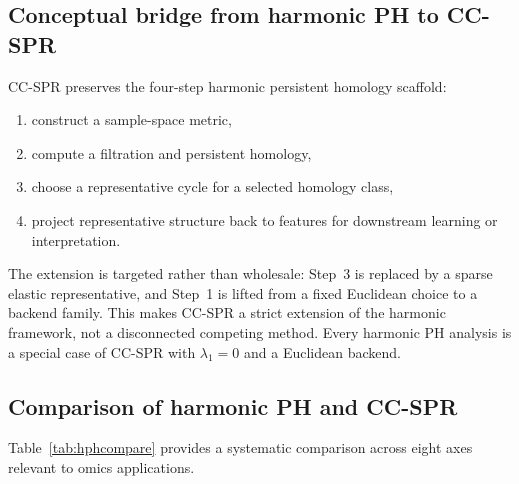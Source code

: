 \documentclass[11pt]{article}
\begin{document}
\subsection{Conceptual bridge from harmonic PH to CC-SPR}

CC-SPR preserves the four-step harmonic persistent homology scaffold:
\begin{enumerate}[leftmargin=1.5em]
\item construct a sample-space metric,
\item compute a filtration and persistent homology,
\item choose a representative cycle for a selected homology class,
\item project representative structure back to features for downstream learning or interpretation.
\end{enumerate}
The extension is targeted rather than wholesale: Step~3 is replaced by a sparse elastic representative, and Step~1 is lifted from a fixed Euclidean choice to a backend family.
This makes CC-SPR a strict extension of the harmonic framework, not a disconnected competing method.
Every harmonic PH analysis is a special case of CC-SPR with $\lambda_1 = 0$ and a Euclidean backend.

\subsection{Comparison of harmonic PH and CC-SPR}

Table~\ref{tab:hphcompare} provides a systematic comparison across eight axes relevant to omics applications.
\end{document}

